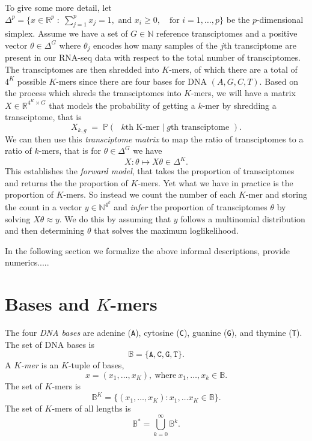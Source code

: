 \documentclass[11pt]{article}
\begin{document}
To give some more detail, let $\Delta^p = \{ x \in \mathbb{R}^p \; : \; \sum_{j=1}^p x_j =1, \mbox{ and }  x_i \geq 0, \quad \mbox{for } i=1,\ldots, p\}$ be the $p$-dimensional simplex. Assume we have a set of $G \in \mathbb{N}$ reference transciptomes and a positive vector  $\theta \in \Delta^G$ where $\theta_j$  encodes how many samples of the $j$th transciptome are present in our RNA-seq data with respect to the total number of transciptomes. The transciptomes are then shredded into $K$-mers, of which there are a total of $4^K$ possible $K$-mers since there are four bases for DNA $(A, G, C, T)$. 
Based on the process which shreds the transciptomes into $K$-mers, we will have a  matrix $X \in \mathbb{R}^{4^K \times G}$ that models the probability of getting a $k$-mer  by shredding a transciptome, that is
\[ X_{k, g}  \; = \; \mathbb{P} (\mbox{ $k$th K-mer} \; | \; \mbox{$g$th transciptome }).\]
We can then use this \emph{transciptome matrix} to map the ratio of transciptomes to a ratio of $k$-mers, that is for  $\theta \in \Delta^G$ we have
\[   X :\theta \mapsto X\theta \in \Delta^K.\] 
 This establishes the \emph{forward model}, that takes the proportion of transciptomes and returns the the proportion of $K$-mers. Yet what we have in practice is the proportion of $K$-mers. So instead we count the number of each $K$-mer and storing the count in a vector $y \in \mathbb{N}^{4^k}$ 
and   \emph{infer} the proportion of transciptomes $\theta$ by solving $ X \theta  \approx y.$
We do this by assuming that $y$ follows a multinomial distribution and then determining $\theta$ that solves the maximum loglikelihood.


In the following section we formalize the above informal descriptions, provide numerics.....


\section{Bases and $K$-mers}

The four \emph{DNA bases} are adenine (\texttt{A}),
cytosine (\texttt{C}), guanine (\texttt{G}), and thymine (\texttt{T}).
The set of DNA bases is
\[
  \mathbb{B} = \{ \texttt{A}, \texttt{C}, \texttt{G}, \texttt{T} \}.
\]
A \emph{$K$-mer} is an $K$-tuple of bases,
\[
  x = (x_1, \ldots, x_K),
  \ \textrm{where}
  \ x_1, \ldots, x_k \in \mathbb{B}.
\]
The set of $K$-mers is
\[
  \mathbb{B}^K
  = \{ (x_1, \ldots, x_K)
      : x_1, \ldots x_K \in \mathbb{B} \}.
\]
The set of $K$-mers of all lengths is
\[
  \mathbb{B}^* = \bigcup_{k=0}^{\infty} \mathbb{B}^k.
\]
\end{document}
